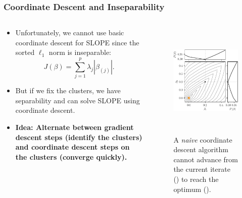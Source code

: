 \documentclass[10pt,aspectratio=169]{beamer}
\begin{document}
\begin{frame}
  \frametitle{Coordinate Descent and Inseparability}
  \begin{columns}
    \begin{column}{0.45\textwidth}
      \begin{itemize}
        \item<1-> Unfortunately, we cannot use basic coordinate descent for SLOPE since the
              sorted \(\ell_1\) norm is \alert{inseparable}:
              \[
                J(\beta) = \sum_{j=1}^p \lambda_j |\beta_{(j)}|.
              \]
        \item<2-> But if we fix the clusters, we have separability and can solve SLOPE using coordinate descent.
        \item<3-> \bfseries{Idea:} Alternate between gradient descent steps (identify the clusters) and
              coordinate descent steps \alert{on the clusters} (converge quickly).
      \end{itemize}
    \end{column}
    \begin{column}{0.45\textwidth}
      \begin{figure}[htpb]
        \centering
        \includegraphics[height=5.5cm]{figures/naive-cd-stuck.pdf}
        \caption{A \emph{naive} coordinate descent algorithm cannot advance from the
          current iterate () to reach the optimum ({\color{orange}}).}
      \end{figure}
    \end{column}
  \end{columns}

\end{frame}

%
%
%
%
\end{document}
